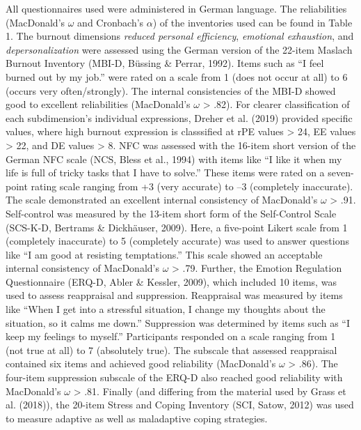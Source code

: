 \documentclass[
  man]{apa6}
\begin{document}
All questionnaires used were administered in German language.
The reliabilities (MacDonald's \(\omega\) and Cronbach's \(\alpha\)) of the inventories used can be found in Table 1.
The burnout dimensions \emph{reduced personal efficiency}, \emph{emotional exhaustion}, and \emph{depersonalization} were assessed using the German version of the 22-item Maslach Burnout Inventory (MBI-D, Büssing \& Perrar, 1992).
Items such as ``I feel burned out by my job.'' were rated on a scale from 1 (does not occur at all) to 6 (occurs very often/strongly).
The internal consistencies of the MBI-D showed good to excellent reliabilities (MacDonald's \(\omega\) \textgreater{} .82).
For clearer classification of each subdimension's individual expressions, Dreher et al. (2019) provided specific values, where high burnout expression is classsified at rPE values \textgreater{} 24, EE values \textgreater{} 22, and DE values \textgreater{} 8.
NFC was assessed with the 16-item short version of the German NFC scale (NCS, Bless et al., 1994) with items like ``I like it when my life is full of tricky tasks that I have to solve.'' These items were rated on a seven-point rating scale ranging from +3 (very accurate) to --3 (completely inaccurate).
The scale demonstrated an excellent internal consistency of MacDonald's \(\omega\) \textgreater{} .91.
Self-control was measured by the 13-item short form of the Self-Control Scale (SCS-K-D, Bertrams \& Dickhäuser, 2009).
Here, a five-point Likert scale from 1 (completely inaccurate) to 5 (completely accurate) was used to answer questions like ``I am good at resisting temptations.''
This scale showed an acceptable internal consistency of MacDonald's \(\omega\) \textgreater{} .79.
Further, the Emotion Regulation Questionnaire (ERQ-D, Abler \& Kessler, 2009), which included 10 items, was used to assess reappraisal and suppression. Reappraisal was measured by items like ``When I get into a stressful situation, I change my thoughts about the situation, so it calms me down.''
Suppression was determined by items such as ``I keep my feelings to myself.''
Participants responded on a scale ranging from 1 (not true at all) to 7 (absolutely true).
The subscale that assessed reappraisal contained six items and achieved good reliability (MacDonald's \(\omega\) \textgreater{} .86).
The four-item suppression subscale of the ERQ-D also reached good reliability with MacDonald's \(\omega\) \textgreater{} .81.
Finally (and differing from the material used by Grass et al. (2018)), the 20-item Stress and Coping Inventory (SCI, Satow, 2012) was used to measure adaptive as well as maladaptive coping strategies.
\end{document}
